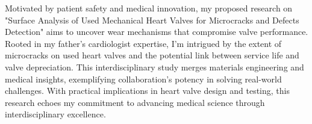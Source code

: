 Motivated by patient safety and medical innovation, my proposed research on "Surface Analysis of Used Mechanical Heart Valves for Microcracks and Defects Detection" aims to uncover wear mechanisms that compromise valve performance. Rooted in my father's cardiologist expertise, I'm intrigued by the extent of microcracks on used heart valves and the potential link between service life and valve depreciation. This interdisciplinary study merges materials engineering and medical insights, exemplifying collaboration's potency in solving real-world challenges. With practical implications in heart valve design and testing, this research echoes my commitment to advancing medical science through interdisciplinary excellence.



